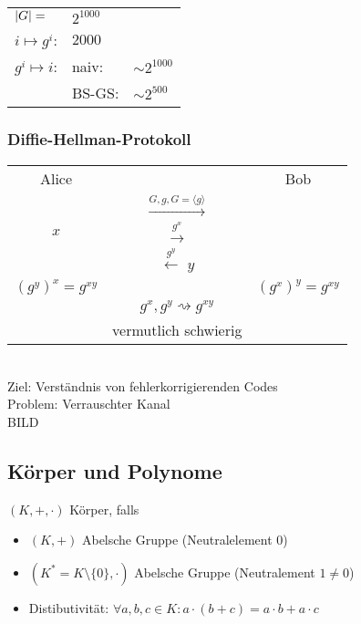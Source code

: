 \begin{bsp*}
	\begin{tabular}{ l l l }
		$\abs{G} =$	&$2^{1000}$				\\
		$i \mapsto g^i$:	&$2000$					\\
		$g^i \mapsto i$:	&naiv:	&$\sim 2^{1000}$	\\
					&BS-GS:	&$\sim 2^{500}$		
	\end{tabular}
\end{bsp*}

\subsubsection{Diffie-Hellman-Protokoll}
\begin{tabular}{ c c c }
	Alice				&	&Bob												\\
					&$\overset{G,g,G=\langle g \rangle}{\rightarrow}$	&				\\
	$x$				&$\overset{g^x}{\rightarrow}$				&				\\
					&$\overset{g^y}{\leftarrow}$				$y$				\\
	$(g^y)^x = g^{xy}$	&									&$(g^x)^y = g^{xy}$	\\
		&$g^x, g^y \rightsquigarrow g^{xy}$						&				\\
		&vermutlich schwierig									&				
\end{tabular}\\
Ziel: Verständnis von fehlerkorrigierenden Codes\\
Problem: Verrauschter Kanal\\
BILD

\subsection{Körper und Polynome}
\begin{def*}[note = Körper , index = Körper]
	$(K,+,\cdot)$ Körper, falls
	\begin{itemize}
		\item $(K,+)$ Abelsche Gruppe (Neutralelement $0$)
		\item $(K^* = K \setminus \{ 0 \},\cdot)$ Abelsche Gruppe (Neutralement $1 \neq 0$)
		\item Distibutivität: $\forall a, b, c \in K : a \cdot (b+c) = a \cdot b + a \cdot c$
	\end{itemize}
\end{def*}

